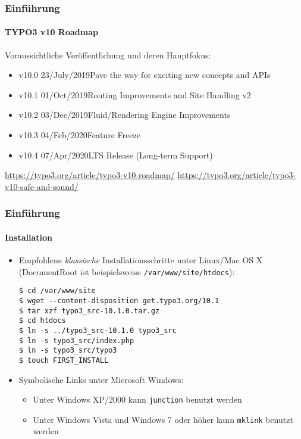 
\begin{frame}[fragile]
	\frametitle{Einführung}
	\framesubtitle{TYPO3 v10 Roadmap}

	Voraussichtliche Veröffentlichung und deren Hauptfokus:

	\begin{itemize}

		\item v10.0 \tabto{1.1cm}23/July/2019\tabto{3.4cm}Pave the way for exciting new concepts and APIs
		\item
			\begingroup
				\color{typo3orange}
				v10.1 \tabto{1.1cm}01/Oct/2019\tabto{3.4cm}Routing Improvements and Site Handling v2
			\endgroup
		\item v10.2 \tabto{1.1cm}03/Dec/2019\tabto{3.4cm}Fluid/Rendering Engine Improvements
		\item v10.3 \tabto{1.1cm}04/Feb/2020\tabto{3.4cm}Feature Freeze
		\item v10.4 \tabto{1.1cm}07/Apr/2020\tabto{3.4cm}LTS Release (Long-term Support)

	\end{itemize}

	\smaller
		\url{https://typo3.org/article/typo3-v10-roadmap/}\newline
		\url{https://typo3.org/article/typo3-v10-safe-and-sound/}
	\normalsize

\end{frame}


\begin{frame}[fragile]
	\frametitle{Einführung}
	\framesubtitle{Installation}

	\begin{itemize}
		\item Empfohlene \textit{klassische} Installationsschritte unter Linux/Mac OS X\newline
			(DocumentRoot ist beispielsweise \texttt{/var/www/site/htdocs}):
		\begin{lstlisting}
$ cd /var/www/site
$ wget --content-disposition get.typo3.org/10.1
$ tar xzf typo3_src-10.1.0.tar.gz
$ cd htdocs
$ ln -s ../typo3_src-10.1.0 typo3_src
$ ln -s typo3_src/index.php
$ ln -s typo3_src/typo3
$ touch FIRST_INSTALL
		\end{lstlisting}

		\item Symbolische Links unter Microsoft Windows:

			\begin{itemize}
				\item Unter Windows XP/2000 kann \texttt{junction} benutzt werden
				\item Unter Windows Vista und Windows 7 oder höher kann \texttt{mklink} benutzt werden
			\end{itemize}

	\end{itemize}
\end{frame}

